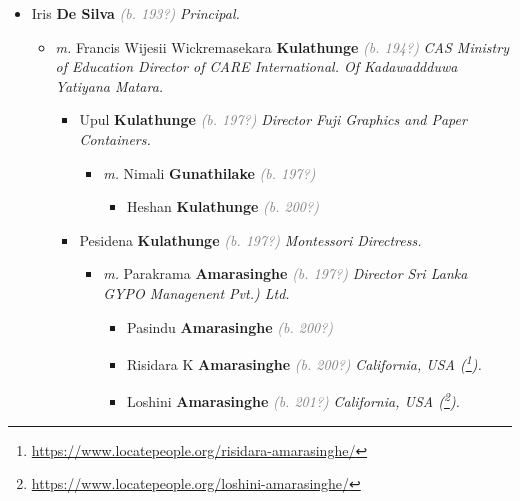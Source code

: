 \documentclass[10pt, openany]{book}
\begin{document}
\begin{itemize}
{\begin{itemize}
{\begin{itemize}
{\begin{itemize}
{\begin{itemize}
{\begin{itemize}
{\begin{itemize}
{ }
\end{itemize}
 }
\end{itemize}}
\end{itemize}
  }
\item{Iris \textbf{De Silva} \textcolor{gray}{\textit{(b. 193?)}} \textcolor{slmaroon}{\textit{Principal.}}
\begin{itemize}
\item{\textit{m.} Francis Wijesii Wickremasekara \textbf{Kulathunge} \textcolor{gray}{\textit{(b. 194?)}} \textcolor{slmaroon}{\textit{CAS Ministry of Education Director of CARE International. Of Kadawaddduwa Yatiyana Matara.}}   \label{couple:00000149:00000488} \begin{itemize}
\item{Upul \textbf{Kulathunge} \textcolor{gray}{\textit{(b. 197?)}} \textcolor{slmaroon}{\textit{Director Fuji Graphics and Paper Containers.}}
\begin{itemize}
\item{\textit{m.} Nimali \textbf{Gunathilake} \textcolor{gray}{\textit{(b. 197?)}}   \label{couple:00000230:00000491} \begin{itemize}
\item{Heshan \textbf{Kulathunge} \textcolor{gray}{\textit{(b. 200?)}}
 }
\end{itemize}}
\end{itemize}
 }
\item{Pesidena \textbf{Kulathunge} \textcolor{gray}{\textit{(b. 197?)}} \textcolor{slmaroon}{\textit{Montessori Directress.}}
\begin{itemize}
\item{\textit{m.} Parakrama \textbf{Amarasinghe} \textcolor{gray}{\textit{(b. 197?)}} \textcolor{slmaroon}{\textit{Director Sri Lanka GYPO Managenent Pvt.) Ltd.}}   \label{couple:00000066:00000490} \begin{itemize}
\item{Pasindu \textbf{Amarasinghe} \textcolor{gray}{\textit{(b. 200?)}}
 }
\item{Risidara K \textbf{Amarasinghe} \textcolor{gray}{\textit{(b. 200?)}} \textcolor{slmaroon}{\textit{California, USA (\footnote{\url{https://www.locatepeople.org/risidara-amarasinghe/}}).}}
  }
\item{Loshini \textbf{Amarasinghe} \textcolor{gray}{\textit{(b. 201?)}} \textcolor{slmaroon}{\textit{California, USA (\footnote{\url{https://www.locatepeople.org/loshini-amarasinghe/}}).}}
}
\end{itemize}}
\end{itemize}}
\end{itemize}}
\end{itemize}}
\end{itemize}}
\end{itemize}}
\end{itemize}}
\end{itemize}
\end{document}
